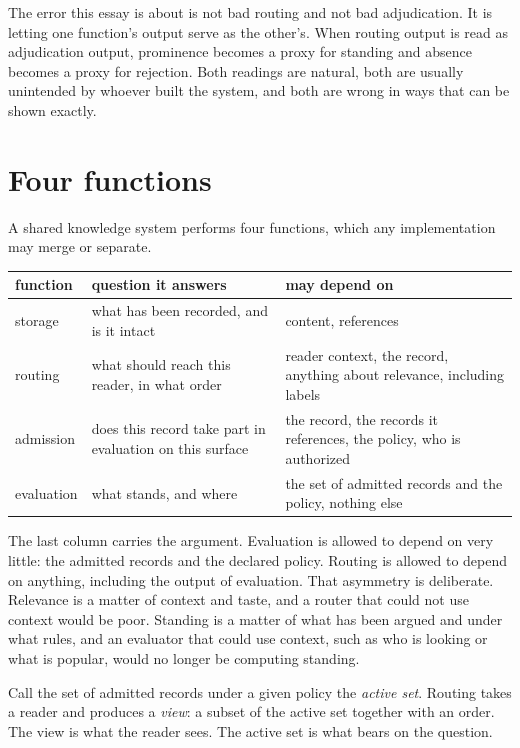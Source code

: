 \documentclass[11pt]{article}
\begin{document}
The error this essay is about is not bad routing and not bad adjudication. It is letting one function's output serve as the other's. When routing output is read as adjudication output, prominence becomes a proxy for standing and absence becomes a proxy for rejection. Both readings are natural, both are usually unintended by whoever built the system, and both are wrong in ways that can be shown exactly.

\section{Four functions}\label{sec:four}

A shared knowledge system performs four functions, which any implementation may merge or separate.

\begin{center}
\small
\begin{tabularx}{\textwidth}{@{}l X X@{}}
\toprule
function & question it answers & may depend on\\
\midrule
storage & what has been recorded, and is it intact & content, references\\
routing & what should reach this reader, in what order & reader context, the record, anything about relevance, including labels\\
admission & does this record take part in evaluation on this surface & the record, the records it references, the policy, who is authorized\\
evaluation & what stands, and where & the set of admitted records and the policy, nothing else\\
\bottomrule
\end{tabularx}
\end{center}

The last column carries the argument. Evaluation is allowed to depend on very little: the admitted records and the declared policy. Routing is allowed to depend on anything, including the output of evaluation. That asymmetry is deliberate. Relevance is a matter of context and taste, and a router that could not use context would be poor. Standing is a matter of what has been argued and under what rules, and an evaluator that could use context, such as who is looking or what is popular, would no longer be computing standing.

Call the set of admitted records under a given policy the \emph{active set}. Routing takes a reader and produces a \emph{view}: a subset of the active set together with an order. The view is what the reader sees. The active set is what bears on the question.
\end{document}
